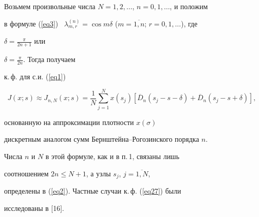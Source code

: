 Возьмем произвольные числа $N=1,2,\dotsc$, $n=0,1,\dotsc$, и положим


в формуле (\ref{eq3}) \ $\lambda_{m,r}^{(n)}=\cos


m\delta$ ($m=\overline{1,n}$; $r=0,1,\dotsc$), где


$\delta=\frac{\pi}{2n+1}$ или


$\delta=\frac{\pi}{2n}$. Тогда получаем


к.\,ф. для с.и. (\ref{eq1})


\begin{equation}\label{eq27}


J(x;s)\approx J_{n,N}(x;s) =


\frac{1}{N}\sum_{j=1}^Nx(s_j)[\overline{D}_n(s_j-s-\delta)


+\overline{D}_n(s_j-s+\delta)],


\end{equation}


основанную на аппроксимации плотности $x(\sigma)$


дискретным аналогом сумм Берн\-штей\-на--Ро\-го\-зин\-ского порядка $n$.


Числа $n$ и $N$ в этой формуле, как и в п.\,1, связаны лишь


соотношением $2n\leq N+1$, а узлы $s_j$, $j=\overline{1,N}$,


определены в (\ref{eq2}). Частные случаи к.\,ф. (\ref{eq27}) были


исследованы в [16].








